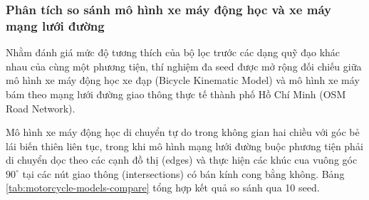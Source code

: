 \subsubsection{Phân tích so sánh mô hình xe máy động học và xe máy mạng lưới đường}

\hspace{0.5cm} Nhằm đánh giá mức độ tương thích của bộ lọc trước các dạng quỹ đạo khác nhau của cùng một phương tiện, thí nghiệm đa seed được mở rộng đối chiếu giữa mô hình xe máy động học xe đạp (Bicycle Kinematic Model) và mô hình xe máy bám theo mạng lưới đường giao thông thực tế thành phố Hồ Chí Minh (OSM Road Network).

Mô hình xe máy động học di chuyển tự do trong không gian hai chiều với góc bẻ lái biến thiên liên tục, trong khi mô hình mạng lưới đường buộc phương tiện phải di chuyển dọc theo các cạnh đồ thị (edges) và thực hiện các khúc cua vuông góc $90^\circ$ tại các nút giao thông (intersections) có bán kính cong bằng không. Bảng \ref{tab:motorcycle-models-compare} tổng hợp kết quả so sánh qua 10 seed.

\begin{table}[H]
\centering
\caption{So sánh thống kê đa seed giữa mô hình xe máy động học và xe máy mạng đường OSM}
\label{tab:motorcycle-models-compare}
\end{table}

